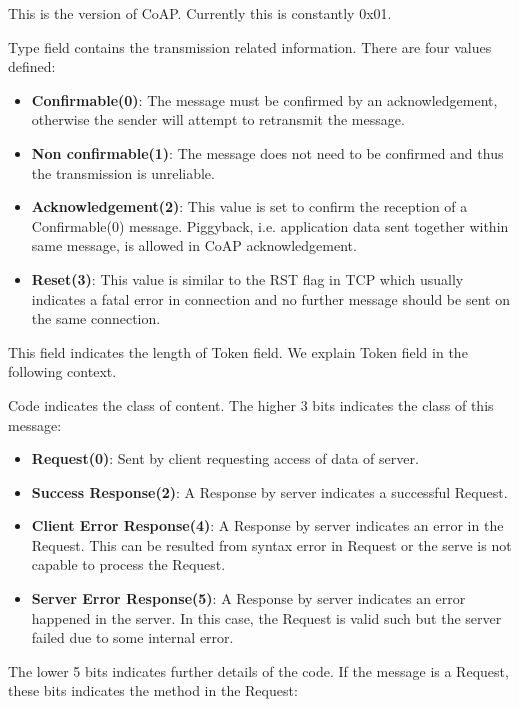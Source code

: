 \begin{description}[style=nextline]
	\item[\textbf{Version}]
	This is the version of CoAP. Currently this is constantly 0x01.
	\item[\textbf{Type}]
	Type field contains the transmission related information. There are four values defined:
	\begin{itemize}
		\item \textbf{Confirmable(0)}: The message must be confirmed by an acknowledgement, otherwise the sender will attempt to retransmit the message.
		\item \textbf{Non confirmable(1)}: The message does not need to be confirmed and thus the transmission is unreliable.
		\item \textbf{Acknowledgement(2)}: This value is set to confirm the reception of a Confirmable(0) message. Piggyback, i.e. application data sent together within same message, is allowed in CoAP acknowledgement.
		\item \textbf{Reset(3)}: This value is similar to the RST flag in TCP which usually indicates a fatal error in connection and no further message should be sent on the same connection.
	\end{itemize}
	\item[\textbf{Token Length}]
	This field indicates the length of Token field. We explain Token field in the following context.
	\item[\textbf{Code}]
	Code indicates the class of content. The higher 3 bits indicates the class of this message:
	\begin{itemize}
		\item \textbf{Request(0)}: Sent by client requesting access of data of server.
		\item \textbf{Success Response(2)}: A Response by server indicates a successful Request.
		\item \textbf{Client Error Response(4)}: A Response by server indicates an error in the Request. This can be resulted from syntax error in Request or the serve is not capable to process the Request.
		\item \textbf{Server Error Response(5)}: A Response by server indicates an error happened in the server. In this case, the Request is valid such but the server failed due to some internal error.
	\end{itemize}
	The lower 5 bits indicates further details of the code.
	If the message is a Request, these bits indicates the method in the Request:
	\begin{itemize}

\end{itemize}
\end{description}
